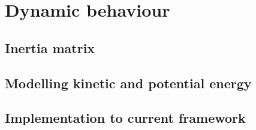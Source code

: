\chapter{Dynamic behaviour}
\lipsum[1]
\section{Inertia matrix}
\section{Modelling kinetic and potential energy}
\section{Implementation to current framework}